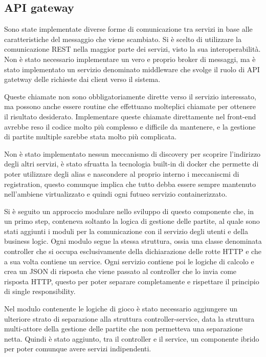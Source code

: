 \subsection{API gateway}
Sono state implementate diverse forme di comunicazione tra servizi in base alle caratteristiche del messaggio che viene scambiato. Si è scelto di utilizzare la comunicazione REST nella maggior parte dei servizi, visto la sua interoperabilità.
Non è stato necessario implementare un vero e proprio broker di messaggi, ma è stato implementato un servizio denominato middleware che svolge il ruolo di API gatetway delle richieste dai client verso il sistema.

Queste chiamate non sono obbligatoriamente dirette verso il servizio interessato, ma possono anche essere routine che effettuano molteplici chiamate per ottenere il risultato desiderato. 
Implementare queste chiamate direttamente nel front-end avrebbe reso il codice molto più complesso e difficile da mantenere, e la gestione di partite multiple sarebbe stata molto più complicata.

\vspace{1cm}

Non è stato implementato nessun meccanismo di discovery per scoprire l'indirizzo degli altri servizi, è stato sfruatta la tecnologia built-in di docker che permette di poter utilizzare degli alias e nascondere al proprio interno i meccaniscmi di registration, questo comunque implica che tutto debba essere sempre mantenuto nell'ambiene virtualizzato e quindi ogni  futueo servizio containerizzato.

\vspace{1cm}

Si è seguito un approccio modulare nello sviluppo di questo componente che, in un primo step, conteneva soltanto la logica di gestione delle partite, al quale sono stati aggiunti i moduli per la comunicazione con il servizio degli utenti e della business logic. Ogni modulo segue la stessa struttura, ossia una classe denominata controller che si occupa esclusivamente della dichiarazione delle rotte HTTP e che a sua volta contiene un service. Ogni servizio contiene poi le logiche di calcolo e crea un JSON di risposta che viene passato al controller che lo invia come risposta HTTP, questo per poter separare completamente e rispettare il principio di single responsibility.

Nel modulo contenente le logiche di gioco è stato necessario aggiungere un ulteriore strato di separazione alla struttura controller-service, data la struttura multi-attore della gestione delle partite che non permetteva una separazione netta. Quindi è stato aggiunto, tra il controller e il service, un componente ibrido per poter comunque avere servizi indipendenti.

